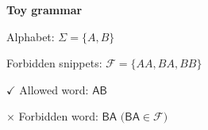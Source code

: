 \documentclass[border=10pt]{standalone}
\begin{document}
\begin{minipage}{9.2cm}
  \sffamily
  \Large
  \setlength{\parindent}{0pt}
  \setlength{\parskip}{0.65em}

  \textbf{Toy grammar}\par
  Alphabet: \(\Sigma = \{A,B\}\)\par
  Forbidden snippets: \(\mathcal{F} = \{AA,BA,BB\}\)\par

  \vspace{0.15em}
  \color{valid}\(\checkmark\) Allowed word: \(\mathsf{AB}\)\par
  \color{invalid}\(\times\) Forbidden word: \(\mathsf{BA}\)
  \quad\(\bigl(\mathsf{BA}\in\mathcal{F}\bigr)\)
\end{minipage}
\end{document}
